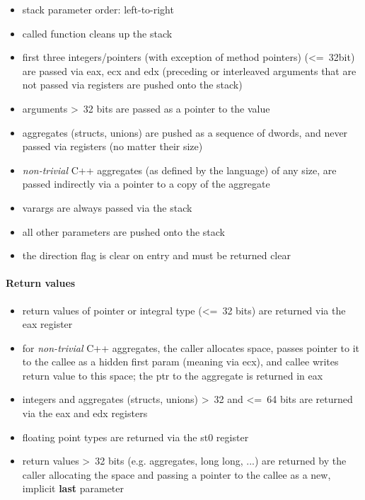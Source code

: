 \begin{itemize}
\item stack parameter order: left-to-right
\item called function cleans up the stack
\item first three integers/pointers (with exception of method pointers) (\textless=\ 32bit) are passed via eax, ecx and edx (preceding or interleaved arguments that are not passed via registers are pushed onto the stack)
\item arguments \textgreater\ 32 bits are passed as a pointer to the value
\item aggregates (structs, unions) are pushed as a sequence of dwords, and never passed via registers (no matter their size)
\item {\it non-trivial} C++ aggregates (as defined by the language) of any size, are passed indirectly via a pointer to a copy of the aggregate
\item varargs are always passed via the stack
\item all other parameters are pushed onto the stack
\item the direction flag is clear on entry and must be returned clear %
\end{itemize}


\paragraph{Return values}

\begin{itemize}
\item return values of pointer or integral type (\textless=\ 32 bits) are returned via the eax register
\item for {\it non-trivial} C++ aggregates, the caller allocates space, passes pointer to it to the callee as a hidden first param
(meaning via ecx), and callee writes return value to this space; the ptr to the aggregate is returned in eax
\item integers and aggregates (structs, unions) \textgreater\ 32 and \textless=\ 64 bits are returned via the eax and edx registers
\item floating point types are returned via the st0 register
\item return values \textgreater\ 32 bits (e.g. aggregates, long long, ...) are returned by the caller allocating the space and
passing a pointer to the callee as a new, implicit {\bf last} parameter
\end{itemize}



